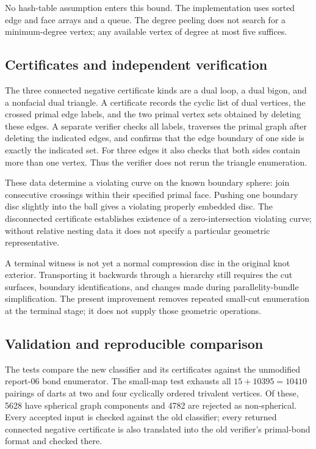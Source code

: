 No hash-table assumption enters this bound.  The implementation uses
sorted edge and face arrays and a queue.  The degree peeling does not
search for a minimum-degree vertex; any available vertex of degree at
most five suffices.

\subsection{Certificates and independent verification}

The three connected negative certificate kinds are a dual loop, a dual
bigon, and a nonfacial dual triangle.  A certificate records the cyclic
list of dual vertices, the crossed primal edge labels, and the two
primal vertex sets obtained by deleting these edges.  A separate
verifier checks all labels, traverses the primal graph after deleting
the indicated edges, and confirms that the edge boundary of one side
is exactly the indicated set.  For three edges it also checks that
both sides contain more than one vertex.  Thus the verifier does not
rerun the triangle enumeration.

These data determine a violating curve on the known boundary sphere:
join consecutive crossings within their specified primal face.  Pushing
one boundary disc slightly into the ball gives a violating properly
embedded disc.  The disconnected certificate establishes existence of
a zero-intersection violating curve; without relative nesting data it
does not specify a particular geometric representative.

A terminal witness is not yet a normal compression disc in the original
knot exterior.  Transporting it backwards through a hierarchy still
requires the cut surfaces, boundary identifications, and changes made
during parallelity-bundle simplification.  The present improvement
removes repeated small-cut enumeration at the terminal stage; it does
not supply those geometric operations.

\subsection{Validation and reproducible comparison}

The tests compare the new classifier and its certificates against the
unmodified report-06 bond enumerator.  The small-map test exhausts all
$15+10395=10410$ pairings of darts at two and four cyclically ordered
trivalent vertices.  Of these, 5628 have spherical graph components
and 4782 are rejected as non-spherical.  Every accepted input is checked
against the old classifier; every returned connected negative
certificate is also translated into the old verifier's primal-bond
format and checked there.

